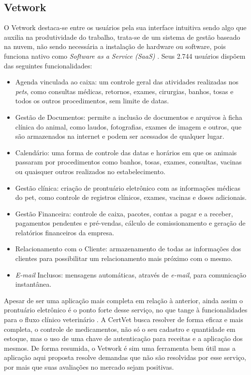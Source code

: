 \documentclass[
    12pt,               %
    openright,          %
    oneside,
    a4paper,            %
    BIBLATEX,           %
    TODO,               %
    english,            %
    brazil              %
    ]{ifsp-spo-inf-ctds}
\begin{document}
        \subsection{Vetwork}
        O Vetwork destaca-se entre os usuários pela sua interface intuitiva sendo algo que auxilia na produtividade do trabalho, trata-se de um sistema de gestão baseado na nuvem, não sendo necessária a instalação de hardware ou software, pois funciona nativo como \emph{Software as a Service (SaaS)} . Seus 2.744 usuários dispõem das seguintes funcionalidades:

\begin{itemize}
    \item Agenda vinculada ao caixa: um controle geral das atividades realizadas nos \emph{pets}, como consultas médicas, retornos, exames, cirurgias, banhos, tosas e todos os outros procedimentos, sem limite de datas.
    \item Gestão de Documentos: permite a inclusão de documentos e arquivos à ficha clínica do animal, como laudos, fotografias, exames de imagem e outros, que são armazenados na internet e podem ser acessados de qualquer lugar.
    \item Calendário: uma forma de controle das datas e horários em que os animais passaram por procedimentos como banhos, tosas, exames, consultas, vacinas ou quaisquer outros realizados no estabelecimento.
    \item Gestão clínica: criação de prontuário eletrônico com as informações médicas do pet, como controle de registros clínicos, exames, vacinas e doses adicionais.
    \item Gestão Financeira: controle de caixa, pacotes, contas a pagar e a receber, pagamentos pendentes e pré-vendas, cálculo de comissionamento e geração de relatórios financeiros da empresa.
    \item Relacionamento com o Cliente: armazenamento de todas as informações dos clientes para possibilitar um relacionamento mais próximo com o mesmo.
    \item \emph{E-mail} Inclusos: mensagens automáticas, através de \emph{e-mail}, para comunicação instantânea.
\end{itemize}

    Apesar de ser uma aplicação mais completa em relação à anterior, ainda assim o prontuário eletrônico é o ponto forte desse serviço, no que tange à funcionalidades para o fluxo clínico veterinário . A CertVet busca resolver de forma eficaz e mais completa, o controle de medicamentos, não só o seu cadastro e quantidade em estoque, mas o uso de uma chave de autenticação para receitas e a aplicação dos mesmos. De forma resumida, o Vetwork é sim uma ferramenta bem útil mas a aplicação aqui proposta resolve demandas que não são resolvidas por esse serviço, por mais que suas avaliações no mercado sejam positivas.
\end{document}
